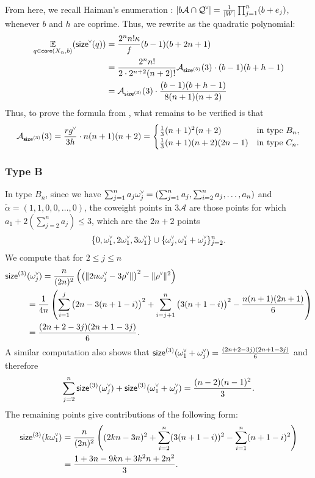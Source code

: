 \documentclass[ALCO,published]{cedram}
\newcommand{\chk}[1]{#1^{\normalfont\smash{\scalebox{.5}[.5]{\rotatebox{90}{\textbf{\textless}}}}}}
\newcommand{\Expt}[2]{\operatorname*{\mathbb{E}}\limits_{#1}(#2)}
\newcommand{\Q}{\mathcal{Q}}
\newcommand{\ac}{\mathcal{A}}
\newcommand{\cw}{\chk{\omega}}
\newcommand{\core}{{\sf core}}
\newcommand{\size}{{\sf size}}
\begin{document}
From here, we recall Haiman's enumeration \cite{haiman1994conjectures}:  $|b\ac\cap\chk{\Q}|=\frac{1}{|W|}\prod_{j=1}^n(b+e_j)$, whenever $b$ and $h$ are coprime. Thus, we rewrite  as the quadratic polynomial:
\begin{align*}
\Expt{q \in \core(X_n,b)}{\chk{\size}(q)} &= \frac{2^n n!\kappa}{f}(b-1)(b+2n+1) \\
&= \frac{2^n n!}{2\cdot 2^{n+2}(n+2)!}\ac_{\size^{(3)}}(3)\cdot (b-1)(b+h-1) \\
& = \ac_{\size^{(3)}}(3)\cdot \frac{(b-1)(b+h-1)}{8(n+1)(n+2)}
\end{align*}
Thus, to prove the formula from , what remains to be verified is that
\[
\ac_{\size^{(3)}}(3)=\frac{r\chk{g}}{3h}\cdot n(n+1)(n+2) =
\begin{cases}
\frac{1}{3}(n+1)^2(n+2) & \text{in type } B_n, \\
\frac{1}{3}(n+1)(n+2)(2n-1) & \text{in type } C_n.
\end{cases}
\]


\subsubsection{Type B}
\label{sec:type_b_calc}

In type $B_n$, since we have $\sum_{j=1}^n a_j \cw_j = (\sum_{j=1}^n a_j,\sum_{i=2}^n a_j,\ldots,a_n)$ and $\widetilde{\alpha}=(1,1,0,0,\ldots,0)$, the coweight points in $3\ac$ are those points for which $a_1+2(\sum_{j=2}^n a_j) \leq 3$, which are the $2n+2$ points \[\{0,\cw_1,2\cw_1,3\cw_1\}\cup \{\cw_j,\cw_1+\cw_j\}_{j=2}^n.\]
We compute that for $2 \leq j \leq n$
\begin{align*}\size^{(3)}&(\cw_j) = \frac{n}{(2n)^2}\left( \left(\|2n\cw_j-3\chk{\rho}\|\right)^2-\|\chk{\rho}\|^2\right)
\\ &=
\frac{1}{4n} \left( \sum_{i=1}^j \big(2n-3(n+1-i)\big)^2+\sum_{i=j+1}^n \big(3(n+1-i)\big)^2 -\frac{n(n+1)(2n+1)}{6}\right) \\ 
 &= \frac{(2n+2-3 j) (2n+1-3 j)}{6}. 
\end{align*}
A similar computation also shows that $\size^{(3)}(\cw_1+\cw_j) = \frac{(2n+2-3 j) (2n+1-3 j)}{6}$
and therefore 
\[\sum_{j=2}^n \size^{(3)}(\cw_j)+\size^{(3)}(\cw_1+\cw_j) = \frac{(n-2) (n-1)^2}{3}.\]
The remaining points give contributions of the following form: 
\begin{align*}
\size^{(3)}(k\cw_1) &= \frac{n}{(2 n)^2} \left( (2 k n - 3n)^2 + 
     \sum_{i=2}^n (3 (n + 1 - i))^2 - \sum_{i=1}^n (n + 1 - i)^2 \right) \\
    &=\frac{1 + 3 n - 9 k n + 3 k^2 n + 2 n^2}{3}.
\end{align*}
\end{document}
